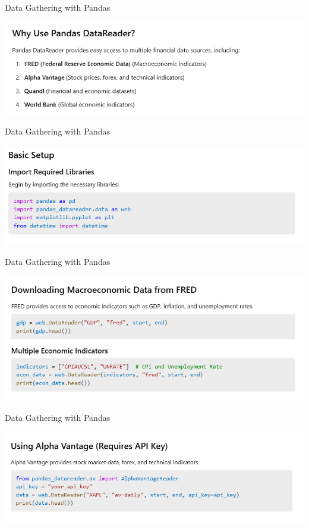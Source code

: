 \documentclass[11pt]{beamer}
\begin{document}
\begin{frame}{Data Gathering with Pandas}
	\begin{center}
	\includegraphics[scale=0.55]{../05-pictures/lesson-1-3_pic_2.png}
	\end{center}
\end{frame}
\begin{frame}{Data Gathering with Pandas}
	\begin{center}
	\includegraphics[scale=0.55]{../05-pictures/lesson-1-3_pic_3.png}
	\end{center}
\end{frame}
\begin{frame}{Data Gathering with Pandas}
	\begin{center}
	\includegraphics[scale=0.55]{../05-pictures/lesson-1-3_pic_4.png}
	\end{center}
\end{frame}
\begin{frame}{Data Gathering with Pandas}
	\begin{center}
	\includegraphics[scale=0.55]{../05-pictures/lesson-1-3_pic_5.png}
	\end{center}
\end{frame}
\end{document}
